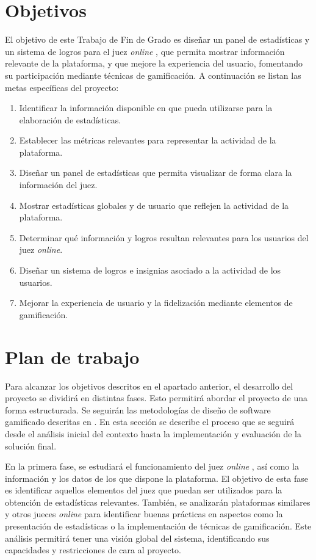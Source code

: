 \section{Objetivos}
El objetivo de este Trabajo de Fin de Grado es diseñar un panel de estadísticas y un sistema de logros para el juez \textit{online} \aer, que permita mostrar información relevante de la plataforma, y que mejore la experiencia del usuario, fomentando su participación mediante técnicas de gamificación. A continuación se listan las metas específicas del proyecto:
\begin{enumerate}
    \item Identificar la información disponible en \aer que pueda utilizarse para la elaboración de estadísticas.
    \item Establecer las métricas relevantes para representar la actividad de la plataforma.
    \item Diseñar un panel de estadísticas que permita visualizar de forma clara la información del juez.
    \item Mostrar estadísticas globales y de usuario que reflejen la actividad de la plataforma.
    \item Determinar qué información y logros resultan relevantes para los usuarios del juez \textit{online}.
    \item Diseñar un sistema de logros e insignias asociado a la actividad de los usuarios.
    \item Mejorar la experiencia de usuario y la fidelización mediante elementos de gamificación.
\end{enumerate}


\section{Plan de trabajo}
Para alcanzar los objetivos descritos en el apartado anterior, el desarrollo del proyecto se dividirá en distintas fases. Esto permitirá abordar el proyecto de una forma estructurada. Se seguirán las metodologías de diseño de software gamificado descritas en \cite{Morschheuser_Hassan_Werder_Hamari_2018}. En esta sección se describe el proceso que se seguirá desde el análisis inicial del contexto hasta la implementación y evaluación de la solución final.

En la primera fase, se estudiará el funcionamiento del juez \textit{online} \aer, así como la información y los datos de los que dispone la plataforma. El objetivo de esta fase es identificar aquellos elementos del juez que puedan ser utilizados para la obtención de estadísticas relevantes. También, se analizarán plataformas similares y otros jueces \textit{online} para identificar buenas prácticas en aspectos como la presentación de estadísticas o la implementación de técnicas de gamificación. Este análisis permitirá tener una visión global del sistema, identificando sus capacidades y restricciones de cara al proyecto.

